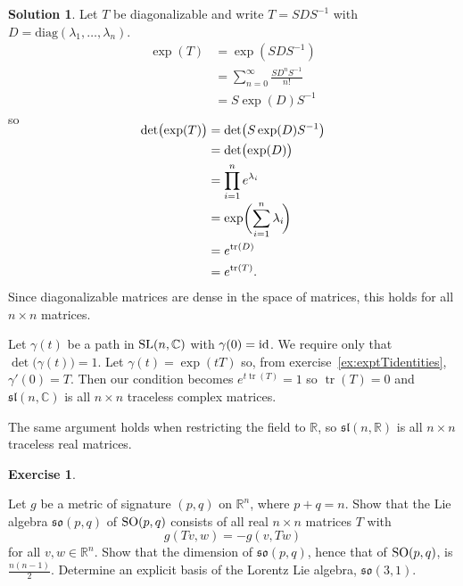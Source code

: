 \documentclass[11pt, a4paper]{report}
\theoremstyle{definition}
\newtheorem{exercise}{Exercise}[part]
\newtheorem{solution}{Solution}[part]
\newenvironment{ex}{\begin{exercise}}{\end{exercise}\pagebreak[1]}
\newenvironment{sol}{\begin{solution}}{\end{solution}\pagebreak[3]}
\newcommand*{\SL}{\ensuremath\text{SL}}
\newcommand*{\SO}{\ensuremath\text{SO}}
\DeclareMathOperator{\tr}{tr}
\newcommand*{\id}{\ensuremath\mathop{}\mathopen{}\mathrm{id}}
\begin{document}
\begin{sol}

Let $T$ be diagonalizable and write $T = SDS^{-1}$ with $D = \mathrm{diag}(\lambda_1, \ldots, \lambda_n)$.
\begin{align*}
    \exp(T) &= \exp(SDS^{-1}) \\
            &= \sum_{n = 0}^\infty \frac{S D^n S^{-1}}{n!} \\
            &= S \exp(D) S^{-1}
\end{align*}
so
\begin{align*}
    \SwapAboveDisplaySkip
    \det\bigl(\exp(T)\bigr) &= \det\bigl(S \exp(D) S^{-1} \bigr) \\
        &= \det\bigl(\exp(D)\bigr) \\
        &= \prod_{i = 1}^n e^{\lambda_i} \\[-1\jot]
        &= \exp \biggl(\sum_{i = 1}^n \lambda_i \! \biggr) \\
        &= e^{\tr(D)} \\
        &= e^{\tr(T)}.
\end{align*}
Since diagonalizable matrices are dense in the space of matrices, this holds for all $n \times n$ matrices.

Let $\gamma(t)$ be a path in $\SL(n, \mathbb{C})$ with $\gamma(0) = \id$. We require only that $\det\bigl(\gamma(t)\bigr) = 1$.
Let $\gamma(t) = \exp(tT)$ so, from exercise~\ref{ex:exptTidentities}, $\gamma'(0) = T$. Then our condition becomes $e^{t \tr(T)} = 1$ so $\tr(T) = 0$ and $\mathfrak{sl}(n, \mathbb{C})$ is all $n \times n$ traceless complex matrices.

The same argument holds when restricting the field to $\mathbb{R}$, so $\mathfrak{sl}(n, \mathbb{R})$ is all $n \times n$ traceless real matrices.

\end{sol}

\begin{ex}\label{ex:lorentzliealgebra}

Let $g$ be a metric of signature $(p, q)$ on $\mathbb{R}^n$, where $p + q = n$.
Show that the Lie algebra $\mathfrak{so}(p, q)$ of $\SO(p, q)$ consists of all real $n \times n$ matrices $T$ with
\[
    g(Tv, w) = -g(v, Tw)
\]
for all $v, w \in \mathbb{R}^n$.
Show that the dimension of $\mathfrak{so}(p, q)$, hence that of $\SO(p, q)$, is $\frac{n(n - 1)}{2}$.
Determine an explicit basis of the Lorentz Lie algebra, $\mathfrak{so}(3, 1)$.

\end{ex}
\end{document}
